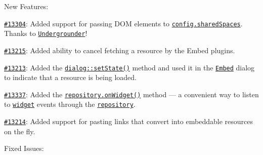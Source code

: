 New Features\+:


\begin{DoxyItemize}
\item \href{http://dev.ckeditor.com/ticket/13304}{\tt \#13304}\+: Added support for passing D\+OM elements to \href{http://docs.ckeditor.com/#!/api/CKEDITOR.config-cfg-sharedSpaces}{\tt {\ttfamily config.\+shared\+Spaces}}. Thanks to \href{https://github.com/Undergrounder}{\tt Undergrounder}!
\item \href{http://dev.ckeditor.com/ticket/13215}{\tt \#13215}\+: Added ability to cancel fetching a resource by the Embed plugins.
\item \href{http://dev.ckeditor.com/ticket/13213}{\tt \#13213}\+: Added the \href{http://docs.ckeditor.com/#!/api/CKEDITOR.dialog-method-setState}{\tt {\ttfamily dialog\+::set\+State()}} method and used it in the \href{http://ckeditor.com/addon/embed}{\tt Embed} dialog to indicate that a resource is being loaded.
\item \href{http://dev.ckeditor.com/ticket/13337}{\tt \#13337}\+: Added the \href{http://docs.ckeditor.com/#!/api/CKEDITOR.plugins.widget.repository-method-onWidget}{\tt {\ttfamily repository.\+on\+Widget()}} method --- a convenient way to listen to \href{http://docs.ckeditor.com/#!/api/CKEDITOR.plugins.widget}{\tt widget} events through the \href{http://docs.ckeditor.com/#!/api/CKEDITOR.plugins.widget.repository}{\tt repository}.
\item \href{http://dev.ckeditor.com/ticket/13214}{\tt \#13214}\+: Added support for pasting links that convert into embeddable resources on the fly.
\end{DoxyItemize}

Fixed Issues\+:


